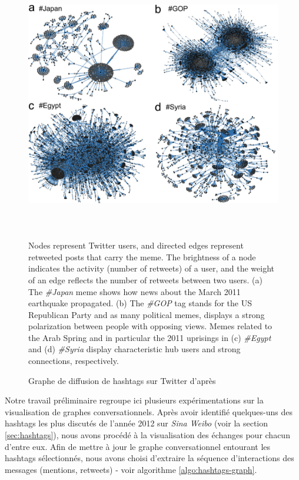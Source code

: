 \begin{figure}[htbp]
    \centering
    \includegraphics[width=5.5669in,height=4.4224in]{figures/chap3/chapitre3-img10.jpg}

    Nodes represent Twitter users, and directed edges represent retweeted posts that carry the meme. The brightness of a node indicates the activity (number of retweets) of a user, and the weight of an edge reflects the number of retweets between two users. \newline
    (a) The \textit{\#Japan}  meme shows how news about the March 2011 earthquake propagated. \newline
    (b) The \textit{\#GOP} tag stands for the US Republican Party and as many political memes, displays a strong polarization between people with opposing views. \newline
    Memes related to the Arab Spring and in particular the 2011 uprisings in (c) \textit{\#Egypt} and (d) \textit{\#Syria} display characteristic hub users and strong connections, respectively.
    
    \caption{Graphe de diffusion de hashtags sur Twitter d{\textquoteright}après \citep{Weng2012} }
    \label{fig:weng-memes}

\end{figure}


Notre travail préliminaire regroupe ici plusieurs expérimentations sur la visualisation de graphes conversationnels. Après avoir identifié quelques-uns des hashtags les plus discutés de l{\textquoteright}année 2012 sur \textit{Sina Weibo} (voir la section \ref{sec:hashtags}), nous avons procédé à la visualisation des échanges pour chacun d'entre eux. Afin de mettre à jour le graphe conversationnel entourant les hashtags sélectionnés, nous avons choisi d{\textquoteright}extraire la séquence d{\textquoteright}interactions des messages (mentions, retweets) - voir algorithme \ref{algo:hashtags-graph}.

